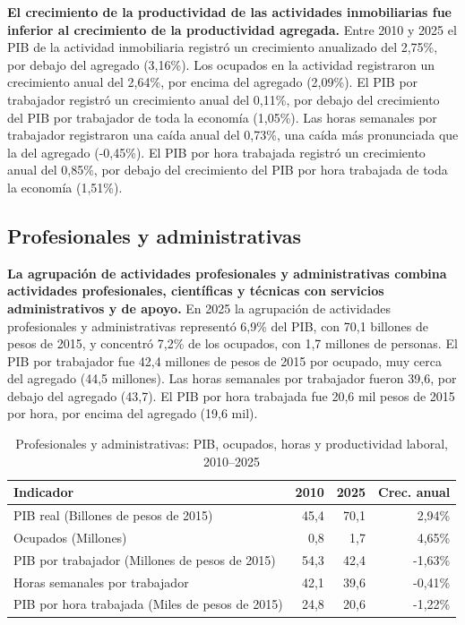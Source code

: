 \textbf{El crecimiento de la productividad de las actividades inmobiliarias fue inferior al crecimiento de la productividad agregada.} Entre 2010 y 2025 el PIB de la actividad inmobiliaria registró un crecimiento anualizado del 2,75\%, por debajo del agregado (3,16\%). Los ocupados en la actividad registraron un crecimiento anual del 2,64\%, por encima del agregado (2,09\%). El PIB por trabajador registró un crecimiento anual del 0,11\%, por debajo del crecimiento del PIB por trabajador de toda la economía (1,05\%). Las horas semanales por trabajador registraron una caída anual del 0,73\%, una caída más pronunciada que la del agregado (-0,45\%). El PIB por hora trabajada registró un crecimiento anual del 0,85\%, por debajo del crecimiento del PIB por hora trabajada de toda la economía (1,51\%).

\subsection{Profesionales y administrativas}

\textbf{La agrupación de actividades profesionales y administrativas combina actividades profesionales, científicas y técnicas con servicios administrativos y de apoyo.} En 2025 la agrupación de actividades profesionales y administrativas representó 6,9\% del PIB, con 70,1 billones de pesos de 2015, y concentró 7,2\% de los ocupados, con 1,7 millones de personas. El PIB por trabajador fue 42,4 millones de pesos de 2015 por ocupado, muy cerca del agregado (44,5 millones). Las horas semanales por trabajador fueron 39,6, por debajo del agregado (43,7). El PIB por hora trabajada fue 20,6 mil pesos de 2015 por hora, por encima del agregado (19,6 mil).

\begin{table}[H]
\centering
\caption{Profesionales y administrativas: PIB, ocupados, horas y productividad laboral, 2010--2025}
\label{tab:sector_m_n_productividad}
\small
\begin{tabular}{lrrr}
\toprule
Indicador & 2010 & 2025 & Crec. anual \\
\midrule
PIB real  (Billones de pesos de 2015) & 45,4 & 70,1 & 2,94\% \\
Ocupados (Millones) & 0,8 & 1,7 & 4,65\% \\
PIB por trabajador (Millones de pesos de 2015) & 54,3 & 42,4 & -1,63\% \\
Horas semanales por trabajador & 42,1 & 39,6 & -0,41\% \\
PIB por hora trabajada (Miles de pesos de 2015) & 24,8 & 20,6 & -1,22\% \\
\bottomrule
\end{tabular}
\end{table}

